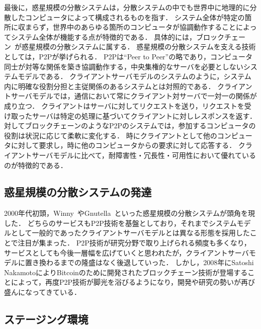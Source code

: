 最後に，惑星規模の分散システムは，分散システムの中でも世界中に地理的に分散したコンピュータによって構成されるものを指す．
システム全体が特定の箇所に収まらず，世界中のあらゆる箇所のコンピュータが協調動作することによってシステム全体が機能する点が特徴的である．
具体的には，ブロックチェーン~\cite{Bitcoin}が惑星規模の分散システムに属する．
惑星規模の分散システムを支える技術としては，P2Pが挙げられる．
P2Pは``Peer to Peer''の略であり，コンピュータ同士が対等な関係を築き協調動作する，中央集権的なサーバを必要としないシステムモデルである．
クライアントサーバモデルのシステムのように，システム内に明確な役割分担と主従関係のあるシステムとは対照的である．
クライアントサーバモデルでは，通信において常にクライアント対サーバで一対一の関係が成り立つ．
クライアントはサーバに対してリクエストを送り，リクエストを受け取ったサーバは特定の処理に基づいてクライアントに対しレスポンスを返す．
対してブロックチェーンのようなP2Pのシステムでは，参加するコンピュータの役割は状況に応じて柔軟に変化する．
時にクライアントとして他のコンピュータに対して要求し，時に他のコンピュータからの要求に対して応答する．
クライアントサーバモデルに比べて，耐障害性・冗長性・可用性において優れているのが特徴的である．

\subsection{惑星規模の分散システムの発達}

2000年代初頭，Winny~\cite{Winny}やGnutella~\cite{Gnutella}といった惑星規模の分散システムが頭角を現した．
どちらのサービスもP2P技術を基盤としており，それまでシステムモデルとして一般的であったクライアントサーバモデルとは異なる形態を採用したことで注目が集まった．
P2P技術が研究分野で取り上げられる頻度も多くなり，サービスとしても今後一層幅を広げていくと思われたが，クライアントサーバモデルに置き換わるまでの隆盛はなく後退していった．
しかし，2008年にSatoshi NakamotoによりBitcoinのために開発されたブロックチェーン技術が登場することによって，再度P2P技術が脚光を浴びるようになり，開発や研究の勢いが再び盛んになってきている．

\subsection{ステージング環境}

